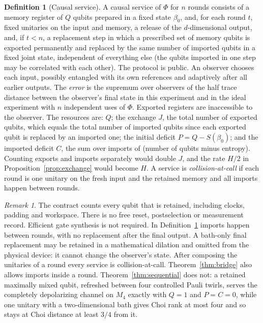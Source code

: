 \documentclass[11pt,a4paper]{article}
\theoremstyle{plain}
\theoremstyle{definition}
\newtheorem{definition}[theorem]{Definition}
\theoremstyle{remark}
\newtheorem{remark}[theorem]{Remark}
\begin{document}
\begin{definition}[Causal service]\label{def:service}
A causal service of $\Phi$ for $n$ rounds consists of a memory register of $Q$ qubits prepared in a fixed state
$\beta_0$, and, for each round $t$, fixed unitaries on the input and memory, a release of the $d$-dimensional
output, and, if $t<n$, a replacement step in which a prescribed set of memory qubits is exported permanently and replaced by the
same number of imported qubits in a fixed joint state, independent of everything else (the qubits imported in one step may be
correlated with each other). The protocol is public. An observer chooses each input, possibly
entangled with its own references and adaptively after all earlier outputs. The \emph{error} is the supremum over
observers of the half trace distance between the observer's final state in this experiment and in the ideal
experiment with $n$ independent uses of $\Phi$. Exported registers are inaccessible to the observer. The resources
are: $Q$; the exchange $J$, the total number of exported qubits, which equals the total number of imported qubits
since each exported qubit is replaced by an imported one; the initial deficit $P=Q-S(\beta_0)$; and the
imported deficit $C$, the sum over imports of (number of qubits minus entropy). Counting exports and imports
separately would double $J$, and the rate $H/2$ in Proposition~\ref{prop:exchange} would become $H$. A service is
\emph{collision-at-call} if each round is one unitary on the fresh input and the retained memory and all imports
happen between rounds.
\end{definition}

\begin{remark}
The contract counts every qubit that is retained, including clocks, padding and workspace. There is no free reset,
postselection or measurement record. Efficient gate synthesis is not required. In Definition~\ref{def:service} imports happen
between rounds, with no replacement after the final output. A bath-only final replacement may be retained in a mathematical dilation and
omitted from the physical device: it cannot change the observer's state. After composing the unitaries of a round every service is collision-at-call. Theorem~\ref{thm:bridge}
also allows imports inside a round. Theorem~\ref{thm:sequential} does not: a retained maximally mixed qubit, refreshed between four
controlled Pauli twirls, serves the completely depolarizing channel on $M_4$ exactly with $Q=1$ and $P=C=0$, while one unitary with a
two-dimensional bath gives Choi rank at most four and so stays at Choi distance at least $3/4$ from it.
\end{remark}
\end{document}

